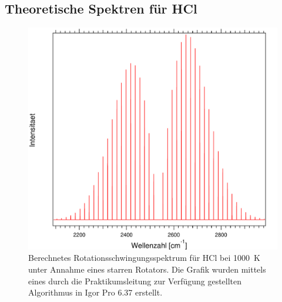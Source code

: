 \subsection*{Theoretische Spektren für HCl}
\begin{figure}[H]
\centering	
	\begin{minipage}{0.8\linewidth}
	\includegraphics[width=\linewidth]{Bilder/1000HCl.pdf}
	\caption{Berechnetes Rotationsschwingungsspektrum für HCl bei 1000~K unter Annahme eines starren Rotators. Die Grafik wurden mittels eines durch die Praktikumsleitung zur Verfügung gestellten Algorithmus in Igor Pro 6.37 erstellt.}
	\label{Rot:1000HCl}
	\end{minipage}

	
	
	
	
\end{figure}


